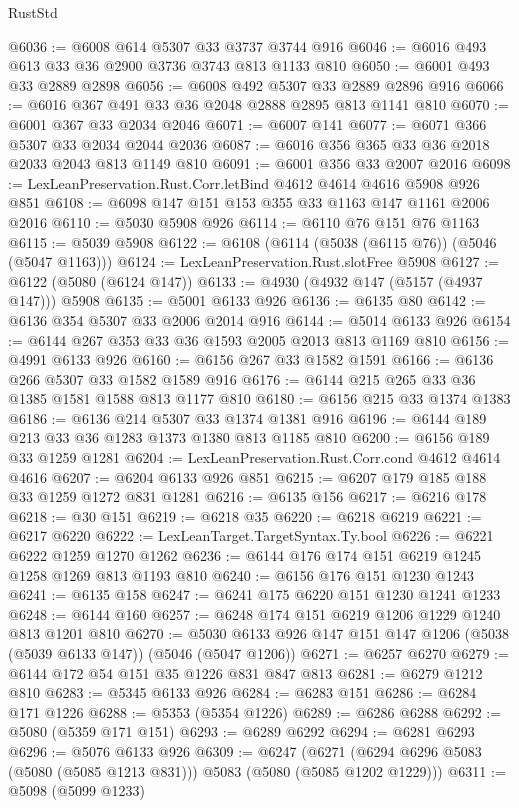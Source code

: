 \begin{lexlean}{RustStd}
\begin{coremodule}
{\begin{coremodule}
{{{{{@6036 := @6008 @614 @5307 @33 @3737 @3744 @916
@6046 := @6016 @493 @613 @33 @36 @2900 @3736 @3743 @813 @1133 @810
@6050 := @6001 @493 @33 @2889 @2898
@6056 := @6008 @492 @5307 @33 @2889 @2896 @916
@6066 := @6016 @367 @491 @33 @36 @2048 @2888 @2895 @813 @1141 @810
@6070 := @6001 @367 @33 @2034 @2046
@6071 := @6007 @141
@6077 := @6071 @366 @5307 @33 @2034 @2044 @2036
@6087 := @6016 @356 @365 @33 @36 @2018 @2033 @2043 @813 @1149 @810
@6091 := @6001 @356 @33 @2007 @2016
@6098 := LexLeanPreservation.Rust.Corr.letBind @4612 @4614 @4616 @5908 @926 @851
@6108 := @6098 @147 @151 @153 @355 @33 @1163 @147 @1161 @2006 @2016
@6110 := @5030 @5908 @926
@6114 := @6110 @76 @151 @76 @1163
@6115 := @5039 @5908
@6122 := @6108 (@6114 (@5038 (@6115 @76)) (@5046 (@5047 @1163)))
@6124 := LexLeanPreservation.Rust.slotFree @5908
@6127 := @6122 (@5080 (@6124 @147))
@6133 := @4930 (@4932 @147 (@5157 (@4937 @147))) @5908
@6135 := @5001 @6133 @926
@6136 := @6135 @80
@6142 := @6136 @354 @5307 @33 @2006 @2014 @916
@6144 := @5014 @6133 @926
@6154 := @6144 @267 @353 @33 @36 @1593 @2005 @2013 @813 @1169 @810
@6156 := @4991 @6133 @926
@6160 := @6156 @267 @33 @1582 @1591
@6166 := @6136 @266 @5307 @33 @1582 @1589 @916
@6176 := @6144 @215 @265 @33 @36 @1385 @1581 @1588 @813 @1177 @810
@6180 := @6156 @215 @33 @1374 @1383
@6186 := @6136 @214 @5307 @33 @1374 @1381 @916
@6196 := @6144 @189 @213 @33 @36 @1283 @1373 @1380 @813 @1185 @810
@6200 := @6156 @189 @33 @1259 @1281
@6204 := LexLeanPreservation.Rust.Corr.cond @4612 @4614 @4616
@6207 := @6204 @6133 @926 @851
@6215 := @6207 @179 @185 @188 @33 @1259 @1272 @831 @1281
@6216 := @6135 @156
@6217 := @6216 @178
@6218 := @30 @151
@6219 := @6218 @35
@6220 := @6218 @6219
@6221 := @6217 @6220
@6222 := LexLeanTarget.TargetSyntax.Ty.bool
@6226 := @6221 @6222 @1259 @1270 @1262
@6236 := @6144 @176 @174 @151 @6219 @1245 @1258 @1269 @813 @1193 @810
@6240 := @6156 @176 @151 @1230 @1243
@6241 := @6135 @158
@6247 := @6241 @175 @6220 @151 @1230 @1241 @1233
@6248 := @6144 @160
@6257 := @6248 @174 @151 @6219 @1206 @1229 @1240 @813 @1201 @810
@6270 := @5030 @6133 @926 @147 @151 @147 @1206 (@5038 (@5039 @6133 @147)) (@5046 (@5047 @1206))
@6271 := @6257 @6270
@6279 := @6144 @172 @54 @151 @35 @1226 @831 @847 @813
@6281 := @6279 @1212 @810
@6283 := @5345 @6133 @926
@6284 := @6283 @151
@6286 := @6284 @171 @1226
@6288 := @5353 (@5354 @1226)
@6289 := @6286 @6288
@6292 := @5080 (@5359 @171 @151)
@6293 := @6289 @6292
@6294 := @6281 @6293
@6296 := @5076 @6133 @926
@6309 := @6247
    (@6271 (@6294 @6296 @5083 (@5080 (@5085 @1213 @831))) @5083 (@5080 (@5085 @1202 @1229)))
@6311 := @5098 (@5099 @1233)
}}}}}
\end{coremodule}}
\end{coremodule}
\end{lexlean}
